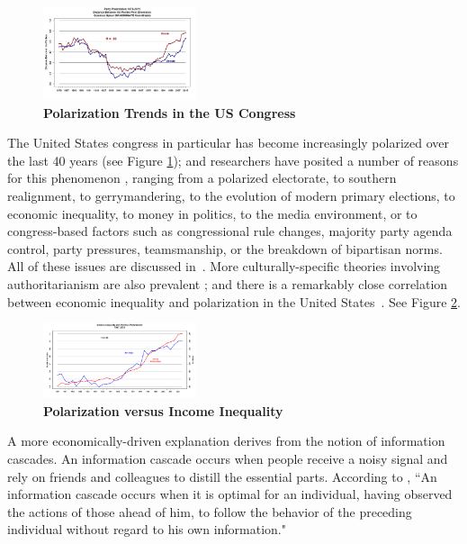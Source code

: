 \begin{figure}[htbp]
\begin{center}
\includegraphics[width=0.4\textwidth]{figs/polar_house_and_senate_46-115_july_11}
\caption{{\bf Polarization Trends in the US Congress}}
\label{fig:uscongress}
\end{center}
\end{figure}

The United States congress in particular has become increasingly polarized over the last 40 years (see Figure \ref{fig:uscongress}); and
researchers have posited a number of reasons for this phenomenon \cite{barber2015causes}\cite{poole1984polarization}, ranging from a polarized electorate, to southern realignment, to gerrymandering, to the evolution of modern primary elections, to economic inequality, to money in politics, to the media environment, or to congress-based factors such as congressional rule changes, majority party agenda control, party pressures, teamsmanship, or the breakdown of bipartisan norms.  All of these issues are discussed in~\cite{poole1984polarization}.
More culturally-specific theories involving authoritarianism are also prevalent \cite{hetherington2009authoritarianism}; and there is a remarkably close correlation between economic
inequality and polarization in the United States~\cite{mccarty2006polarized}.  See Figure \ref{fig:inequality}.

\begin{figure}[htbp]
\begin{center}
\includegraphics[width=0.4\textwidth]{figs/8141eb7a0}
\caption{{\bf Polarization versus Income Inequality}}
\label{fig:inequality}
\end{center}
\end{figure}


A more economically-driven explanation derives from the notion of information cascades. An information cascade occurs when people receive a noisy signal and rely on friends and colleagues to distill the essential parts.  According to \cite{bikhchandani1992theory},
``An information cascade occurs when it is optimal for an individual, having observed the actions of those ahead of him, to follow the behavior of the preceding individual without regard to his own information." 

